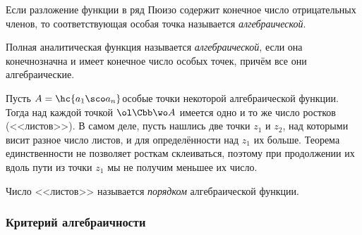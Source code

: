 \documentclass[a4paper]{article}
\begin{document}
\begin{df}
Если разложение функции в ряд Пюизо содержит конечное число отрицательных членов, то
соответствующая особая точка называется \emph{алгебраической}.
\end{df}

\begin{df}
Полная аналитическая функция называется \emph{алгебраической}, если она конечнозначна и имеет конечное число
особых точек, причём все они алгебраические.
\end{df}

Пусть $A = \hc{a_1\sco a_n}$\т особые точки некоторой алгебраической функции. Тогда над каждой точкой $\ol\Cbb\wo A$ имеется
одно и то же число ростков (<<листов>>). В самом деле, пусть нашлись две точки $z_1$ и $z_2$, над которыми висит
разное число листов, и для определённости над $z_1$ их больше. Теорема единственности не позволяет росткам склеиваться,
поэтому при продолжении их вдоль пути из точки $z_1$ мы не получим меньшее их число.

\begin{df}
Число <<листов>> называется \emph{порядком} алгебраической функции.
\end{df}

\subsubsection{Критерий алгебраичности}
\end{document}
